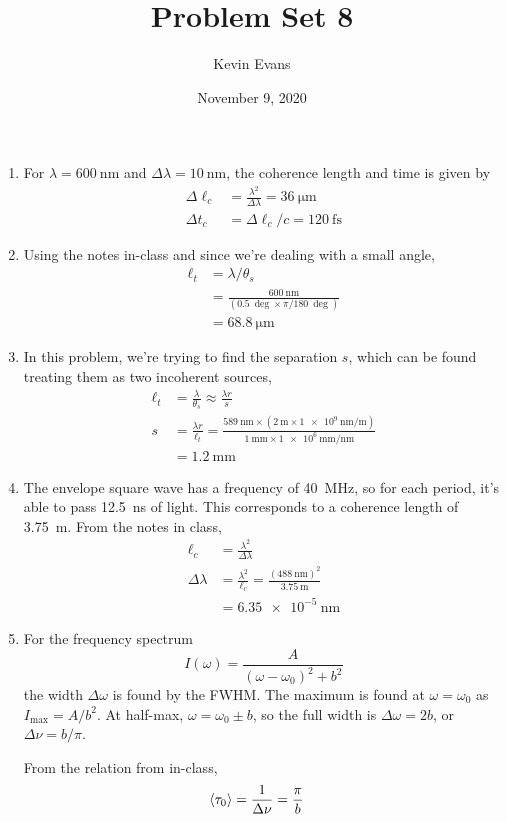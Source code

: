 \documentclass{homework}
\title{Problem Set 8}
\author{Kevin Evans}
\date{November 9, 2020}
\begin{document}
	\maketitle
	\begin{enumerate}
		\item For $\lambda = \SI{600}{\nm}$ and $\Delta \lambda = \SI{10}{\nm}$, the coherence length and time is given by \begin{align*}
			\Delta \ell_c & = \frac{\lambda^2}{\Delta \lambda} = \SI{36}{\um} \\
			\Delta t_c & = \Delta \ell_c / c = \SI{120}{\fs}
		\end{align*}
	
		\item Using the notes in-class and since we're dealing with a small angle, \begin{align*}
			\ell_t & = \lambda / \theta_s \\
				& = \frac{\SI{600}{\nm}}{\left(\SI{0.5}{\deg} \times \pi / \SI{180}{\deg}\right)} \\
				& = \SI{68.8}{\um}
		\end{align*}
	
		\item In this problem, we're trying to find the separation $s$, which can be found treating them as two incoherent sources, 
		\begin{align*}
			\ell_t & = \frac{\lambda}{\theta_s} \approx \frac{\lambda r}{s} \\
			s & = \frac{\lambda r}{\ell_t} = \frac{\SI{589}{\nm} \times \left(\SI{2}{\m} \times \SI{1e9}{\nm/\m}\right)}{\SI{1}{\mm} \times \SI{1e6}{\mm/\nm}} \\
				& = \SI{1.2}{\mm}
		\end{align*}
	
		\item The envelope square wave has a frequency of \SI{40}{\MHz}, so for each period, it's able to pass \SI{12.5}{\ns} of light. This corresponds to a coherence length of \SI{3.75}{\m}. From the notes in class, \begin{align*}
			\ell_c & = \frac{\lambda^2}{\Delta \lambda} \\
			\Delta \lambda & = \frac{\lambda^2}{\ell_c} = \frac{\left(\SI{488}{\nm}\right)^2}{\SI{3.75}{\m}} \\
				& = \SI{6.35e-5}{\nm}
		\end{align*}
		
		\item For the frequency spectrum $$I(\omega) = \frac{A}{(\omega - \omega_0)^2 + b^2}$$ the width $\Delta \omega$ is found by the FWHM. The maximum is found at $\omega = \omega_0$ as $I_\mathrm{max} = A/b^2$. At half-max, $\omega=\omega_0 \pm b$, so the full width is $\Delta \omega = 2b$, or $\Delta \nu = b / \pi$. 
		
		From the relation from in-class, \begin{align*}
			\expval{\tau_0} & = \frac{1}{\Delta \nu} = \frac{\pi}{b}
		\end{align*}
	\end{enumerate}
\end{document}
